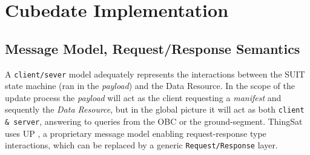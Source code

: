 \section{Cubedate Implementation}
\label{sec:implementation}

\iffalse
SUIT is used in Cubedate payloads as a \textit{Data Delivery Mechanism} bundling
the security properties described in section IV D. The implementation described
next seeks to remain generic to be re-usable in different scenarios while tailored
for the Satellite ThingSat use case.

SUIT state machine running on the deployed device does not need to care about
how this \textit{Data} is delivered or where it will be installed, it just
needs to be handed a \textit{manifest}.

\begin{itemize}
    \item \textbf{Data Resource URI}: a locally (e.g.: mounted USB  device) or remotely
    (HTTP or CoAP endpoint) accessible file.
    \item \textbf{Data Resource Delivery Mechanism}: transport mechanism to deliver SUIT:
    e.g. \{message model, network stack, network interface\}
    bundle, or FileSystem \textit{read/write} functions.
    \textit{manifest} and data resource to the SUIT state machine.
    \item \textbf{Data Resource Installation Storage}: internal or external Volatile or
    Non-volatile storage, e.g. RAM (mission files, FemtoContainers\cite{zandberg2021femto})
    or FileSystem or internal FLASH.
\end{itemize}

As the case where the Data Resource URI points to a locally available is simply a
simplified case, a networked scenario with a URL will be described.

\francisco{PLACE HOLDER FOR A DIAGRAM}
\fi



\subsection{Message Model, Request/Response Semantics}

A \texttt{client/sever} model adequately represents the interactions between the SUIT state
machine (ran in the \textit{payload}) and the Data Resource. In the scope of the
update process the \textit{payload} will act as the client requesting a \textit{manifest}
and sequently the \textit{Data Resource}, but in the global picture it will act
as both \texttt{client \& server}, answering to queries from the OBC or the
ground-segment. ThingSat uses UP , a proprietary message
model enabling request-response type interactions, which can be replaced by a
generic \texttt{Request/Response} layer.


